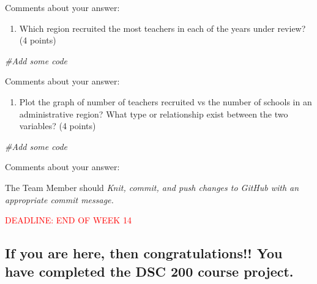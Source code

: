\documentclass[
]{article}
\newenvironment{Shaded}{\begin{snugshade}}{\end{snugshade}}
\newcommand{\CommentTok}[1]{\textcolor[rgb]{0.56,0.35,0.01}{\textit{#1}}}
\providecommand{\tightlist}{%
  \setlength{\itemsep}{0pt}\setlength{\parskip}{0pt}}
\begin{document}
Comments about your answer:

\begin{enumerate}
\def\labelenumi{(\alph{enumi})}
\setcounter{enumi}{1}
\tightlist
\item
  Which region recruited the most teachers in each of the years under
  review? (4 points)
\end{enumerate}

\begin{Shaded}
\begin{Highlighting}[]
\CommentTok{\#Add some code}
\end{Highlighting}
\end{Shaded}

Comments about your answer:

\begin{enumerate}
\def\labelenumi{(\alph{enumi})}
\setcounter{enumi}{2}
\tightlist
\item
  Plot the graph of number of teachers recruited vs the number of
  schools in an administrative region? What type or relationship exist
  between the two variables? (4 points)
\end{enumerate}

\begin{Shaded}
\begin{Highlighting}[]
\CommentTok{\#Add some code}
\end{Highlighting}
\end{Shaded}

Comments about your answer:

The Team Member should \emph{Knit, commit, and push changes to GitHub
with an appropriate commit message.}

\textcolor{red}{DEADLINE: END OF WEEK 14}

\hypertarget{if-you-are-here-then-congratulations-you-have-completed-the-dsc-200-course-project.}{%
\subsection{If you are here, then congratulations!! You have completed
the DSC 200 course
project.}\label{if-you-are-here-then-congratulations-you-have-completed-the-dsc-200-course-project.}}
\end{document}
